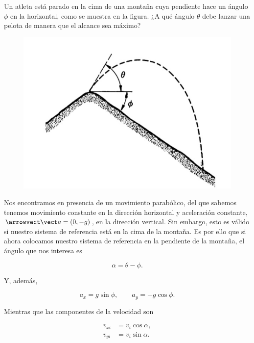 \documentclass[../main.tex]{subfiles}
\begin{document}
\begin{problema}
	Un atleta está parado en la cima de una montaña cuya pendiente hace
	un ángulo \(\phi\) en la horizontal, como se muestra en la figura.
	¿A qué ángulo \(\theta\) debe lanzar una pelota de manera
	que el alcance sea máximo?

	\begin{figure}[htp]
		\centering
		\includegraphics[scale=.4,trim={2cm 1cm 1.2cm 1.2cm}, clip]{../figs/problema_02.jpg}
	\end{figure}

	\startsolution

	Nos encontramos en presencia de un movimiento parabólico, del que sabemos
	tenemos movimiento constante en la dirección horizontal y aceleración constante,
	\(\va{a} = (0, -g)\), en la dirección vertical. Sin embargo, esto es válido si
	nuestro sistema de referencia está en la cima de la montaña. Es por ello que si
	ahora colocamos nuestro sistema de referencia en la pendiente de la montaña, el
	ángulo que nos interesa es

	\begin{equation*}
		\alpha = \theta - \phi.
	\end{equation*}

	Y, además,

	\begin{equation*}
		a_{x} = g\sin\phi,\qquad a_{y} = -g\cos\phi.
	\end{equation*}

	Mientras que las componentes de la velocidad son

	\begin{align*}
		v_{xi} & = v_{i}\cos\alpha, \\
		v_{yi} & = v_{i}\sin\alpha.
	\end{align*}


\end{problema}
\end{document}

